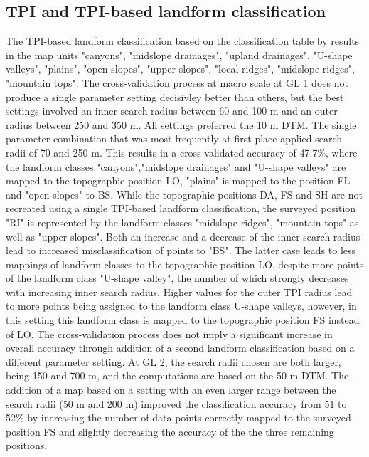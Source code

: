 \documentclass[final,1p,times,twocolumn,authoryear]{elsarticle}
\begin{document}
\subsection{TPI and TPI-based landform classification}
The TPI-based landform classification based on the  classification table by \cite{Weiss2000} results in the map units "canyons", "midslope drainages", "upland drainages", "U-shape valleys", "plains", "open slopes", "upper slopes", "local ridges", "midslope ridges", "mountain tops". The cross-validation process at macro scale at GL 1 does not produce a single parameter setting decisivley better than others, but the best settings involved an inner search radius between 60 and 100 m and an outer radius between 250  and 350 m. All settings preferred the 10 m DTM. The single parameter combination that was most frequently at first place applied search radii of 70 and 250 m. This results in a cross-validated accuracy of 47.7\%, where the landform classes "canyons","midslope drainages" and "U-shape valleys" are mapped to the topographic position LO, "plains" is mapped to the position FL and "open slopes" to BS. While the topographic positions DA, FS and SH are not recreated using a single TPI-based landform classification, the surveyed position "RI" is represented by the landform classes "midslope ridges", "mountain tops" as well as "upper slopes". Both an increase and a decrease of the inner search radius lead to increased misclassification of points to "BS". The latter case leads to less mappings of landform classes to the topographic position LO, despite more points of the landform class "U-shape valley", the number of which strongly decreases with increasing inner search radius. Higher values for the outer TPI radius lead to more points being assigned to the landform class U-shape valleys, however, in this setting this landform class is mapped to the topographic position FS instead of LO. The cross-validation process does not imply a significant increase in overall accuracy through addition of a second landform classification based on a different parameter setting. At GL 2, the search radii chosen are both larger, being 150 and 700 m, and the computations are based on the 50 m DTM. The addition of a map based on a setting with an even larger range between the search radii (50 m and 200 m) improved the classification accuracy from 51 to 52\% by increasing the number of data points correctly mapped to the surveyed position FS and slightly decreasing the accuracy of the the three remaining positions.  
\end{document}
